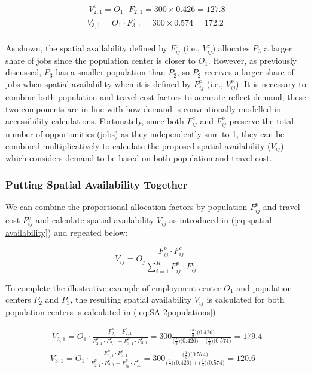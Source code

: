 \documentclass[]{elsarticle} %
\begin{document}
\begin{equation}
\label{eq:tcost-allocation-factor-SA-2populations}
\begin{array}{l}\
V^c_{2,1} = O_1 \cdot F^c_{2,1} = 300 \times 0.426 = 127.8\\
V^c_{3,1} = O_1 \cdot F^c_{3,1} = 300 \times  0.574 = 172.2\\
\end{array}
\end{equation}

As shown, the spatial availability defined by \(F^c_{ij}\) (i.e.,
\(V^c_{ij}\)) allocates \(P_3\) a larger share of jobs since the
population center is closer to \(O_1\). However, as previously
discussed, \(P_3\) has a smaller population than \(P_2\), so \(P_2\)
receives a larger share of jobs when spatial availability when it is
defined by \(F^p_{ij}\) (i.e., \(V^p_{ij}\)). It is necessary to combine
both population and travel cost factors to accurate reflect demand;
these two components are in line with how demand is conventionally
modelled in accessibility calculations. Fortunately, since both
\(F^c_{ij}\) and \(F^p_{ij}\) preserve the total number of opportunities
(jobs) as they independently sum to 1, they can be combined
multiplicatively to calculate the proposed spatial availability
(\(V_{ij}\)) which considers demand to be based on both population and
travel cost.

\hypertarget{putting-spatial-availability-together}{%
\subsubsection{Putting Spatial Availability
Together}\label{putting-spatial-availability-together}}

We can combine the proportional allocation factors by population
\(F^p_{ij}\) and travel cost \(F^c_{ij}\) and calculate spatial
availability \(V_{ij}\) as introduced in (\ref{eq:spatial-availability})
and repeated below:

\[
V_{ij} = O_j\frac{F^p_{ij} \cdot F^c_{ij}}{\sum_{i=1}^K F^p_{ij} \cdot F^c_{ij}}
\]

To complete the illustrative example of employment center \(O_1\) and
population centers \(P_2\) and \(P_3\), the resulting spatial
availability \(V_{ij}\) is calculated for both population centers is
calculated in (\ref{eq:SA-2populations}).

\begin{equation}
\label{eq:SA-2populations}
\begin{array}{l}\
V_{2,1} = O_1\cdot \frac{F^p_{2,1} \cdot F^c_{2,1}}{F^p_{2,1} \cdot F^c_{2,1} + F^p_{3,1} \cdot F^c_{3,1}} = 300 \frac{\big(\frac{2}{3} \big) \big(0.426 \big)}{\big(\frac{2}{3} \big) \big(0.426 \big) + \big(\frac{1}{3} \big) \big(0.574 \big)} = 179.4\\
V_{3,1} = O_1\cdot \frac{F^p_{3,1} \cdot F^c_{3,1}}{F^p_{2,1} \cdot F^c_{2,1} + F^p_{ik} \cdot F^c_{ik}} = 300 \frac{\big(\frac{1}{3} \big) \big(0.574 \big)}{\big(\frac{2}{3} \big) \big(0.426 \big) + \big(\frac{1}{3} \big) \big(0.574 \big)}  =  120.6 \\
\end{array}
\end{equation}
\end{document}
